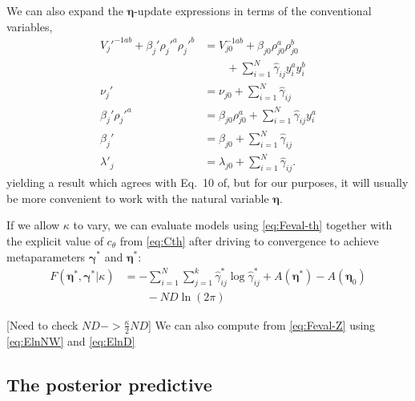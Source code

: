 \documentclass[aps,showpacs,twocolumn,prd,superscriptaddress,nofootinbib]{revtex4}
\newcommand{\nn}{\nonumber}
\begin{document}
We can also expand the $\bm\eta$-update expressions in terms of the conventional variables, 
\begin{align}
  V_j'^{-1ab}+\beta_j'\rho_j'^a\rho_j'^b
  &=  V_{j0}^{-1ab}+\beta_{j0}\rho_{j0}^a\rho_{j0}^b
  \nn\\&\qquad
  +\sum_{i=1}^N\hat\gamma_{ij}y_i^ay_i^b 
  \nn\\
  \nu_j'
  &=\nu_{j0}
    +\sum_{i=1}^N\hat\gamma_{ij}
  \nn\\
  \beta_j'\rho_j'^a
  &=  \beta_{j0}\rho_{j0}^a+\sum_{i=1}^N\hat\gamma_{ij}y_i^a 
  \nn\\
  \beta_j'
  &=
  \beta_{j0}+\sum_{i=1}^N\hat\gamma_{ij}
  \nn\\
  \lambda'_{j}&=
  \lambda_{j0}+\sum_{i=1}^N\hat\gamma_{ij}.\label{eq:meta-update}
\end{align}
yielding a result which agrees with Eq.~10 of\cite{Attias2000}, but for our purposes, it will usually be more convenient to work with the natural variable $\bm\eta$.


If we allow $\kappa$ to vary, we can evaluate models using \eqref{eq:Feval-th} together with the explicit value of $c_\theta$ from \eqref{eq:Cth} after driving to convergence to achieve metaparameters $\bm\gamma^*$ and $\bm\eta^*$:
\begin{align}
    F(\bm\eta^*,\bm\gamma^*|\kappa)&=
    -\sum_{i=1}^N\sum_{j=1}^k\hat\gamma^*_{ij}\log\hat\gamma^*_{ij}
    +A(\bm\eta^*)-A(\bm\eta_{0})
  \nn\\&\qquad
  -ND\ln(2\pi)
\end{align}

[Need to check $ND->\frac\kappa2ND$]
We can also compute from \eqref{eq:Feval-Z} using \eqref{eq:ElnNW} and \eqref{eq:ElnD}

\subsection{The posterior predictive}
\end{document}
